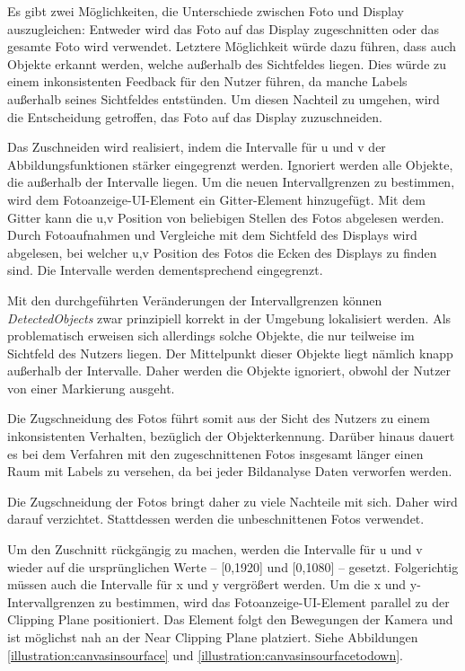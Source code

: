 Es gibt zwei Möglichkeiten, die Unterschiede zwischen Foto und Display auszugleichen: Entweder wird das Foto auf das Display zugeschnitten oder das gesamte Foto wird verwendet. Letztere Möglichkeit würde dazu führen, dass auch Objekte erkannt werden, welche außerhalb des Sichtfeldes liegen. Dies würde zu einem inkonsistenten Feedback für den Nutzer führen, da manche Labels außerhalb seines Sichtfeldes entstünden. Um diesen Nachteil zu umgehen, wird die Entscheidung getroffen, das Foto auf das Display zuzuschneiden.

Das Zuschneiden wird realisiert, indem die Intervalle für u und v der Abbildungsfunktionen stärker eingegrenzt werden. Ignoriert werden alle Objekte, die außerhalb der Intervalle liegen. Um die neuen Intervallgrenzen zu bestimmen, wird dem Fotoanzeige-UI-Element ein Gitter-Element hinzugefügt. Mit dem Gitter kann die u,v Position von beliebigen Stellen des Fotos abgelesen werden. Durch Fotoaufnahmen und Vergleiche mit dem Sichtfeld des Displays wird abgelesen, bei welcher u,v Position des Fotos die Ecken des Displays zu finden sind. Die Intervalle werden dementsprechend eingegrenzt. 

Mit den durchgeführten Veränderungen der Intervallgrenzen können \textit{DetectedObjects} zwar prinzipiell korrekt in der Umgebung lokalisiert werden. Als problematisch erweisen sich allerdings solche Objekte, die nur teilweise im Sichtfeld des Nutzers liegen. Der Mittelpunkt dieser Objekte liegt nämlich knapp außerhalb der Intervalle. Daher werden die Objekte ignoriert, obwohl der Nutzer von einer Markierung ausgeht. 

Die Zugschneidung des Fotos führt somit aus der Sicht des Nutzers zu einem inkonsistenten Verhalten, bezüglich der Objekterkennung. Darüber hinaus dauert es bei dem Verfahren mit den zugeschnittenen Fotos insgesamt länger einen Raum mit Labels zu versehen, da bei jeder Bildanalyse Daten verworfen werden. 

Die Zugschneidung der Fotos bringt daher zu viele Nachteile mit sich. Daher wird darauf verzichtet. Stattdessen werden die unbeschnittenen Fotos verwendet.

Um den Zuschnitt rückgängig zu machen, werden die Intervalle für u und v wieder auf die ursprünglichen Werte – [0,1920] und [0,1080] –  gesetzt. Folgerichtig müssen auch die Intervalle für x und y vergrößert werden. Um die x und y-Intervallgrenzen zu bestimmen, wird das Fotoanzeige-UI-Element parallel zu der Clipping Plane positioniert. Das Element folgt den Bewegungen der Kamera und ist möglichst nah an der Near Clipping Plane platziert. Siehe Abbildungen \ref{illustration:canvasinsourface} und \ref{illustration:canvasinsourfacetodown}.

